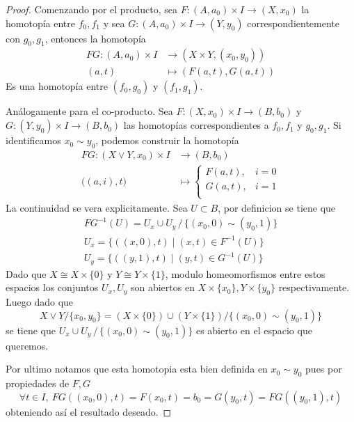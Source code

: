 \begin{proof}
Comenzando por el producto, sea \(F : (A,a_0) \times I \to (X,x_0)\) la homotopía
entre \(f_0 , f_1\) y sea \(G : (A,a_0) \times I \to (Y,y_0)\)
correspondientemente con \(g_0, g_1\), entonces la homotopía
\begin{align*}
  FG : (A,a_0) \times I &\to \left( X \times Y , (x_0, y_0) \right) \\
       (a, t) &\mapsto (F(a,t) , G(a,t))
\end{align*}
Es una homotopía entre \((f_0 , g_0)\) y \((f_1 , g_1)\).

Análogamente para el co-producto. Sea \(F : (X,x_0) \times I \to
(B,b_0)\) y \(G : (Y,y_0) \times I \to (B,b_0)\) las homotopías
correspondientes a \(f_0 , f_1\) y \(g_0
, g_1\). Si identificamos \(x_0 \sim y_0\), podemos construir la homotopía
\begin{align*}
  FG : \left( X \vee Y , x_0 \right) \times I &\to (B, b_0) \\
  \big((a,i) , t \big) &\mapsto
                \begin{cases}
                  F(a,t), & i = 0 \\
                  G(a,t), & i = 1 \\
                \end{cases}
\end{align*}
La continuidad se vera explicitamente. Sea \(U \subset B\), por definicion
se tiene que
\begin{gather*}
  FG^{-1} \left( U \right) = U_x \cup U_y \, / \, \{(x_0,0) \sim (y_0, 1)\} \\
  U_x = \{ \left( (x,0), t \right) \mid (x,t) \in F^{-1} \left( U \right)\} \\
  U_y = \{ \left( (y,1), t \right) \mid (y,t) \in G^{-1} \left(U \right)\}
\end{gather*}
Dado que \(X \cong X \times \{0\}\) y \(Y \cong Y \times \{1\}\), modulo
homeomorfismos entre estos espacios los conjuntos \(U_x, U_y\) son
abiertos en \(X \times \{x_0\}, Y \times \{y_0\}\) respectivamente.
Luego dado que
\[ X \vee Y / \{ x_0 , y_0\} = \left( X \times \{0\} \right) \cup \left(
    Y \times \{1\} \right) / \{(x_0 , 0 ) \sim (y_0 , 1)\} \]
se tiene que \(U_x \cup U_y \, / \, \{ (x_0 , 0) \sim (y_0, 1)\}\) es
abierto en el espacio que queremos.

Por ultimo notamos que esta homotopia esta bien definida en \(x_0 \sim y_0\) pues por propiedades de \(F, G\)
\[
  \forall t \in I,\ FG \left( (x_0,0) , t \right) = F (x_0, t) = b_0 =
  G(y_0, t) = FG \left( (y_0,1), t \right)
\]
obteniendo así el resultado deseado.
\end{proof}

